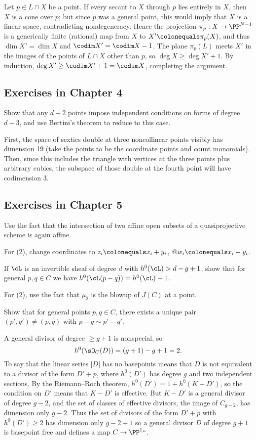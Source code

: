  Let $p\in L\cap X$ be a point. If every secant to $X$ through
$p$ lies entirely in $X$, then $X$ is a cone over $p$; but since $p$
was a general point, this would imply that $X$ is a linear space,
contradicting nondegeneracy.
Hence
the projection $\pi_{p}:X \to \PP^{N-1}$ is a generically
finite (rational) map from $X$ to $X' \colonequals  \pi_{p}(X)$,
and thus $\dim X' = \dim X$ and $\codim X' = \codim X-1$. The plane
$\pi_{p}(L)$ meets $X'$ in the images of the points of $L\cap X$ other
than $p$, so
$\deg X\geq \deg X'+1$. By induction, $\deg X' \geq \codim X'+1 = \codim
X$, completing the argument.

\subsection*{Exercises in Chapter 4\nopunct}

Show that any $d-2$ points impose independent conditions on
forms of degree $d-3$, and use
Bertini's theorem
%
to reduce to this case.

First, the space of sextics double at three noncollinear points
visibly has dimension 19 (take the points to be the coordinate points
and count monomials). Then, since this includes the triangle with
vertices at the three points plus arbitrary cubics, the subspace of
those double at the fourth point will have codimension 3.

\subsection*{Exercises in Chapter 5\nopunct}

 Use the fact that the intersection of two affine open
subsets of a quasiprojective scheme is again affine.

For (2), change coordinates to
$z_i \colonequals x_i+y_i$, $@w_i \colonequals x_i - y_i$.

If $\cL$ is an invertible sheaf of degree $d$ with $h^0(\cL) > d-g+1$,
show that for general $p, q \in C$ we have $h^0(\cL(p-q))  = h^0(\cL) - 1$.

For (2), use the fact that $\mu_2$ is the blowup
%
of $J(C)$ at a point.

Show that for general points $p, q \in C$, there exists a unique pair
$(p',q') \neq (p,q)$ with $p - q \sim p'-q'$.

A general divisor of degree $\geq g+1$ is nonspecial, so
$$h^0(\sO_C(D)) = (g+1)-g+1 = 2.$$
To say that the linear series $|D|$ has no basepoints means that $D$ is not equivalent to a divisor of the form
$D'+p$, where $h^0(D')$ has degree $g$ and two independent sections.
By the
Riemann--Roch theorem,
%
$h^0(D') = 1+h^0(K-D')$,
so the condition on $D'$ means that $K-D'$ is effective.
But $K-D'$ is a general divisor of degree $g-2$, and
the set of classes of effective divisors, the image of $C_{g-2}$, has dimension only $g-2$.
Thus the set of divisors of the form $D'+p$ with $h^0(D') \geq 2$ has dimension only $g -2 +1$
so a general divisor $D$ of degree $g+1$ is basepoint free and defines a map $C\to \PP^1` `$.

